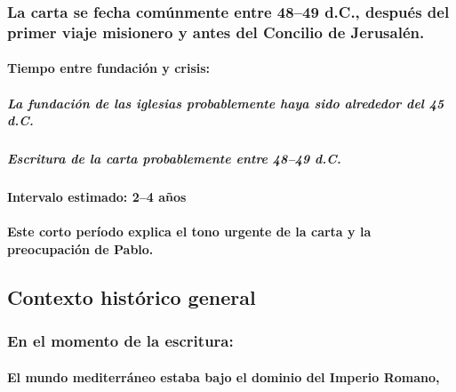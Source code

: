 \documentclass[11a pt,twoside]{article}
\let\oldsubsection\subsection
\renewcommand{\subsection}{\needspace{5\baselineskip}\oldsubsection}
\let\oldsubsubsection\subsubsection
\renewcommand{\subsubsection}{\needspace{4\baselineskip}\oldsubsubsection}
\let\oldparagraph\paragraph
\renewcommand{\paragraph}{\needspace{3\baselineskip}\oldparagraph}
\let\oldsubparagraph\subparagraph
\renewcommand{\subparagraph}{\needspace{2\baselineskip}\oldsubparagraph}
\begin{document}
\subsubsection{La carta se fecha comúnmente entre 48--49 d.C., después
del primer viaje misionero y antes del Concilio de
Jerusalén.}\label{la-carta-se-fecha-comuxfanmente-entre-4849-d.c.-despuuxe9s-del-primer-viaje-misionero-y-antes-del-concilio-de-jerusaluxe9n.}

\paragraph{Tiempo entre fundación y
crisis:}\label{tiempo-entre-fundaciuxf3n-y-crisis}

\subparagraph{La fundación de las iglesias probablemente haya sido
alrededor del 45
d.C.}\label{la-fundaciuxf3n-de-las-iglesias-probablemente-haya-sido-alrededor-del-45-d.c.}

\subparagraph{Escritura de la carta probablemente entre 48--49
d.C.}\label{escritura-de-la-carta-probablemente-entre-4849-d.c.}

\paragraph{Intervalo estimado: 2--4
años}\label{intervalo-estimado-24-auxf1os}

\paragraph{Este corto período explica el tono urgente de la carta y la
preocupación de
Pablo.}\label{este-corto-peruxedodo-explica-el-tono-urgente-de-la-carta-y-la-preocupaciuxf3n-de-pablo.}

\subsection{Contexto histórico
general}\label{contexto-histuxf3rico-general}

\subsubsection{En el momento de la
escritura:}\label{en-el-momento-de-la-escritura}

\paragraph{El mundo mediterráneo estaba bajo el dominio del Imperio
Romano,}\label{el-mundo-mediterruxe1neo-estaba-bajo-el-dominio-del-imperio-romano}
\end{document}
